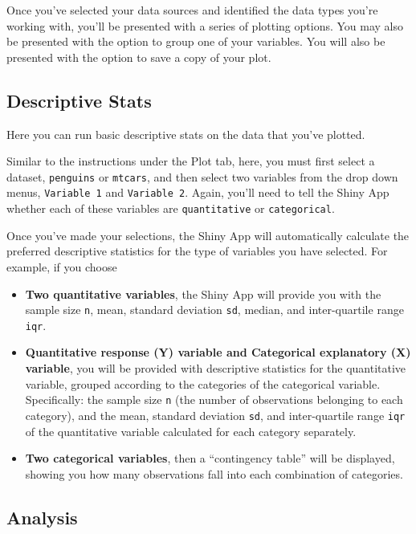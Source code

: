 \documentclass[
]{book}
\providecommand{\tightlist}{%
  \setlength{\itemsep}{0pt}\setlength{\parskip}{0pt}}
\begin{document}
Once you've selected your data sources and identified the data types you're working with, you'll be presented with a series of plotting options. You may also be presented with the option to group one of your variables. You will also be presented with the option to save a copy of your plot.

\hypertarget{descriptive-stats-1}{%
\subsection*{Descriptive Stats}\label{descriptive-stats-1}}

Here you can run basic descriptive stats on the data that you've plotted.

Similar to the instructions under the Plot tab, here, you must first select a dataset, \texttt{penguins} or \texttt{mtcars}, and then select two variables from the drop down menus, \texttt{Variable\ 1} and \texttt{Variable\ 2}. Again, you'll need to tell the Shiny App whether each of these variables are \texttt{quantitative} or \texttt{categorical}.

Once you've made your selections, the Shiny App will automatically calculate the preferred descriptive statistics for the type of variables you have selected. For example, if you choose

\begin{itemize}
\tightlist
\item
  \textbf{Two quantitative variables}, the Shiny App will provide you with the sample size \texttt{n}, mean, standard deviation \texttt{sd}, median, and inter-quartile range \texttt{iqr}.
\item
  \textbf{Quantitative response (Y) variable and Categorical explanatory (X) variable}, you will be provided with descriptive statistics for the quantitative variable, grouped according to the categories of the categorical variable. Specifically: the sample size \texttt{n} (the number of observations belonging to each category), and the mean, standard deviation \texttt{sd}, and inter-quartile range \texttt{iqr} of the quantitative variable calculated for each category separately.
\item
  \textbf{Two categorical variables}, then a ``contingency table'' will be displayed, showing you how many observations fall into each combination of categories.
\end{itemize}

\hypertarget{analysis}{%
\subsection*{Analysis}\label{analysis}}
\end{document}
